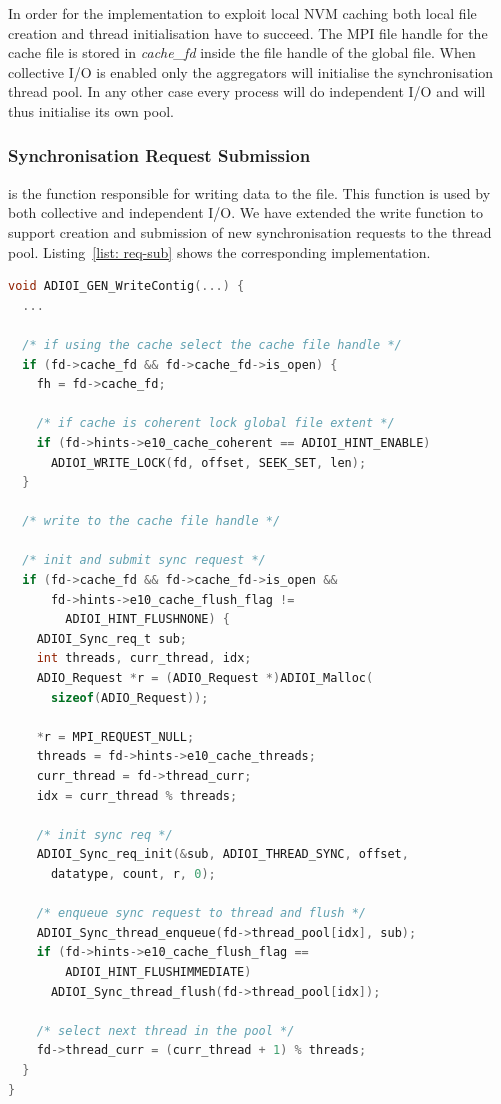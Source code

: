 In order for the implementation to exploit local NVM caching both local file creation and thread initialisation have to succeed. The MPI file handle for the cache file is stored in \textit{cache\_fd} inside the file handle of the global file. When collective I/O is enabled only the aggregators will initialise the synchronisation thread pool. In any other case every process will do independent I/O and will thus initialise its own pool.

\subsubsection{Synchronisation Request Submission}
\label{subsubsec: sync-req-sub}
 is the function responsible for writing data to the file. This function is used by both collective and independent I/O. We have extended the write function to support creation and submission of new synchronisation requests to the thread pool. Listing~\ref{list: req-sub} shows the corresponding implementation.

\begin{lstlisting}[language=C, caption=Synchronisation Request Submission, label={list: req-sub}]
void ADIOI_GEN_WriteContig(...) {
  ...

  /* if using the cache select the cache file handle */
  if (fd->cache_fd && fd->cache_fd->is_open) {
    fh = fd->cache_fd;

    /* if cache is coherent lock global file extent */ 
    if (fd->hints->e10_cache_coherent == ADIOI_HINT_ENABLE)
      ADIOI_WRITE_LOCK(fd, offset, SEEK_SET, len);
  }

  /* write to the cache file handle */

  /* init and submit sync request */
  if (fd->cache_fd && fd->cache_fd->is_open && 
      fd->hints->e10_cache_flush_flag != 
        ADIOI_HINT_FLUSHNONE) {
    ADIOI_Sync_req_t sub;
    int threads, curr_thread, idx;
    ADIO_Request *r = (ADIO_Request *)ADIOI_Malloc(
      sizeof(ADIO_Request));

    *r = MPI_REQUEST_NULL;
    threads = fd->hints->e10_cache_threads;
    curr_thread = fd->thread_curr;
    idx = curr_thread % threads;

    /* init sync req */
    ADIOI_Sync_req_init(&sub, ADIOI_THREAD_SYNC, offset, 
      datatype, count, r, 0);

    /* enqueue sync request to thread and flush */
    ADIOI_Sync_thread_enqueue(fd->thread_pool[idx], sub);
    if (fd->hints->e10_cache_flush_flag == 
        ADIOI_HINT_FLUSHIMMEDIATE)
      ADIOI_Sync_thread_flush(fd->thread_pool[idx]);

    /* select next thread in the pool */
    fd->thread_curr = (curr_thread + 1) % threads;
  }
}
\end{lstlisting}

